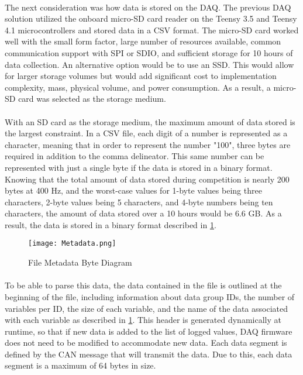 \paragraph{}
The next consideration was how data is stored on the DAQ.
The previous DAQ solution utilized the onboard micro-SD card reader on the Teensy 3.5 \cite{TEENSY35} and Teensy 4.1 \cite{TEENSY41} microcontrollers and stored data in a CSV format.
The micro-SD card worked well with the small form factor, large number of resources available, common communication support with SPI or SDIO, and sufficient storage for 10 hours of data collection.
An alternative option would be to use an SSD.
This would allow for larger storage volumes but would add significant cost to implementation complexity, mass, physical volume, and power consumption.
As a result, a micro-SD card was selected as the storage medium.

\paragraph{}
With an SD card as the storage medium, the maximum amount of data stored is the largest constraint.
In a CSV file, each digit of a number is represented as a character, meaning that in order to represent the number "100", three bytes are required in addition to the comma delineator.
This same number can be represented with just a single byte if the data is stored in a binary format.
Knowing that the total amount of data stored during competition is nearly 200 bytes at 400 Hz, and the worst-case values for 1-byte values being three characters, 2-byte values being 5 characters, and 4-byte numbers being ten characters, the amount of data stored over a 10 hours would be 6.6 GB.
As a result, the data is stored in a binary format described in \cref{fig:MetadataDiagram}.

\begin{figure}[H]
	\centering
	\texttt{[image: Metadata.png]}
	\caption{File Metadata Byte Diagram}
	\label{fig:MetadataDiagram}
\end{figure}

\paragraph{}
To be able to parse this data, the data contained in the file is outlined at the beginning of the file, including information about data group IDs, the number of variables per ID, the size of each variable, and the name of the data associated with each variable as described in \cref{fig:MetadataDiagram}.
This header is generated dynamically at runtime, so that if new data is added to the list of logged values, DAQ firmware does not need to be modified to accommodate new data.
Each data segment is defined by the CAN message that will transmit the data.
Due to this, each data segment is a maximum of 64 bytes in size.

